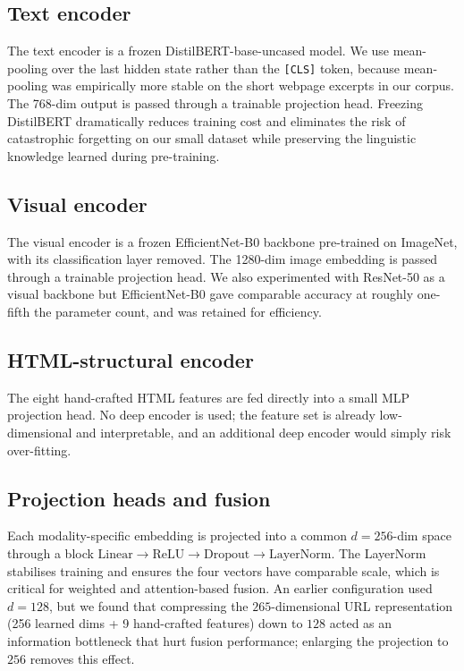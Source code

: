\documentclass[conference]{IEEEtran}
\begin{document}
\subsection{Text encoder}
The text encoder is a frozen DistilBERT-base-uncased model. We use
mean-pooling over the last hidden state rather than the
\texttt{[CLS]} token, because mean-pooling was empirically more
stable on the short webpage excerpts in our corpus. The 768-dim
output is passed through a trainable projection head. Freezing
DistilBERT dramatically reduces training cost and eliminates the
risk of catastrophic forgetting on our small dataset while
preserving the linguistic knowledge learned during pre-training.

\subsection{Visual encoder}
The visual encoder is a frozen EfficientNet-B0 \cite{effnet}
backbone pre-trained on ImageNet, with its classification layer
removed. The 1280-dim image embedding is passed through a
trainable projection head. We also experimented with ResNet-50 as
a visual backbone but EfficientNet-B0 gave comparable accuracy at
roughly one-fifth the parameter count, and was retained for
efficiency.

\subsection{HTML-structural encoder}
The eight hand-crafted HTML features are fed directly into a small
MLP projection head. No deep encoder is used; the feature set is
already low-dimensional and interpretable, and an additional deep
encoder would simply risk over-fitting.

\subsection{Projection heads and fusion}
Each modality-specific embedding is projected into a common
$d=256$-dim space through a block
$\text{Linear}\rightarrow\text{ReLU}\rightarrow\text{Dropout}\rightarrow
\text{LayerNorm}$. The LayerNorm stabilises training and ensures
the four vectors have comparable scale, which is critical for
weighted and attention-based fusion. An earlier configuration used
$d=128$, but we found that compressing the $265$-dimensional URL
representation (256 learned dims + 9 hand-crafted features) down to
$128$ acted as an information bottleneck that hurt fusion
performance; enlarging the projection to $256$ removes this effect.
\end{document}
